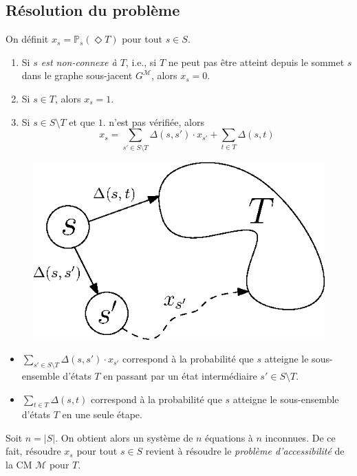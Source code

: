 \documentclass[12pt,a4paper]{report}
\theoremstyle{definition}%
\theoremstyle{remark}
\newcommand{\ie}{i.e., }
\let\labelitemi\labelitemii
\begin{document}
\subsection{Résolution du problème}
On définit $x_s = \mathbb{P}_s(\Diamond T)$ pour tout $s \in S$.
\begin{enumerate}
	\item Si \textit{$s$ est non-connexe à $T$}, \ie si $T$ ne peut pas être atteint depuis le sommet $s$ dans le graphe sous-jacent $G^\mathcal{M}$, alors $x_s = 0$.
	\item Si $s \in T$, alors $x_s = 1$.
	\item Si $s \in S \setminus T$ et que $1.$ n'est pas vérifiée, alors
		\[ x_s = \sum_{s' \in S \setminus T} \Delta(s, s') \cdot x_{s'} + \sum_{t \in T} \Delta(s, t) \]
\end{enumerate}

\begin{figure}[H]
	\centering
	\includegraphics[scale=0.6]{figures/reachability.eps}
	\label{reachablity}
\end{figure}

\begin{itemize}
\renewcommand{\labelitemi}{\tiny$\bullet$}
	\item $ \sum_{s' \in S \setminus T}  \Delta(s, s') \cdot x_{s'} $ correspond à la probabilité que $s$ atteigne le sous-ensemble d'états $T$ en passant par un état intermédiaire $s' \in S \setminus T$.
	\item $\sum_{t \in T} \Delta(s, t)$ correspond à la probabilité que $s$ atteigne le sous-ensemble d'états $T$ en une seule étape.
\end{itemize}
Soit $n = |S|$. On obtient alors un système de $n$ équations à $n$ inconnues. De ce fait, résoudre $x_s$ pour tout $s\in S$ revient à résoudre le \textit{problème d'accessibilité} de la CM $\mathcal{M}$ pour $T$.
\end{document}

